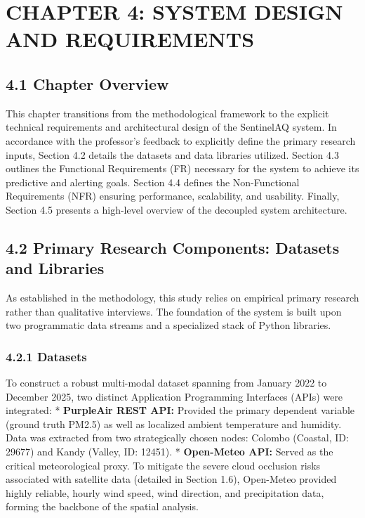 \chapter{CHAPTER 4: SYSTEM DESIGN AND
REQUIREMENTS}\label{chapter-4-system-design-and-requirements}

\section{4.1 Chapter Overview}\label{chapter-overview}

This chapter transitions from the methodological framework to the
explicit technical requirements and architectural design of the
SentinelAQ system. In accordance with the professor's feedback to
explicitly define the primary research inputs, Section 4.2 details the
datasets and data libraries utilized. Section 4.3 outlines the
Functional Requirements (FR) necessary for the system to achieve its
predictive and alerting goals. Section 4.4 defines the Non-Functional
Requirements (NFR) ensuring performance, scalability, and usability.
Finally, Section 4.5 presents a high-level overview of the decoupled
system architecture.

\section{4.2 Primary Research Components: Datasets and
Libraries}\label{primary-research-components-datasets-and-libraries}

As established in the methodology, this study relies on empirical
primary research rather than qualitative interviews. The foundation of
the system is built upon two programmatic data streams and a specialized
stack of Python libraries.

\subsection{4.2.1 Datasets}\label{datasets}

To construct a robust multi-modal dataset spanning from January 2022 to
December 2025, two distinct Application Programming Interfaces (APIs)
were integrated: * \textbf{PurpleAir REST API:} Provided the primary
dependent variable (ground truth PM2.5) as well as localized ambient
temperature and humidity. Data was extracted from two strategically
chosen nodes: Colombo (Coastal, ID: 29677) and Kandy (Valley, ID:
12451). * \textbf{Open-Meteo API:} Served as the critical meteorological
proxy. To mitigate the severe cloud occlusion risks associated with
satellite data (detailed in Section 1.6), Open-Meteo provided highly
reliable, hourly wind speed, wind direction, and precipitation data,
forming the backbone of the spatial analysis.


